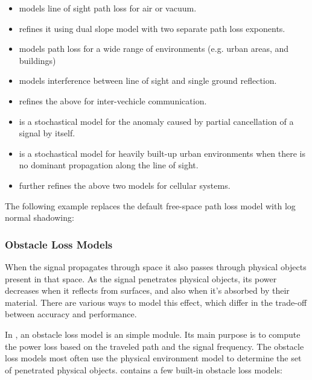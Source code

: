 \begin{itemize}
        \item {} models line of sight path loss for air or vacuum.
        \item {} refines it using dual slope model with two separate path loss exponents.
        \item {} models path loss for a wide range of environments (e.g. urban areas, and buildings)
        \item {} models interference between line of sight and single ground reflection.
        \item {} refines the above for inter-vechicle communication.
        \item {} is a stochastical model for the anomaly caused by partial cancellation of a signal by itself.
        \item {} is a stochastical model for heavily built-up urban environments when there is no dominant propagation along the line of sight.
        \item {} further refines the above two models for cellular systems.
\end{itemize}

The following example replaces the default free-space path loss model with log normal shadowing:


\subsubsection*{Obstacle Loss Models}

When the signal propagates through space it also passes through physical objects present in that space. As the signal penetrates physical objects, its power decreases when it reflects from surfaces, and also when it’s absorbed by their material. There are various ways to model this effect, which differ in the trade-off between accuracy and performance.

In \inet, an obstacle loss model is an \omnet simple module. Its main purpose is to compute the power loss based on the traveled path and the signal frequency. The obstacle loss models most often use the physical environment model to determine the set of penetrated physical objects. \inet contains a few built-in obstacle loss models:


